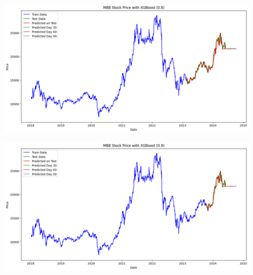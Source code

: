 \documentclass[conference]{IEEEtran}
\begin{document}
\begin{minipage}{0.23\textwidth}
    \centering
    \includegraphics[width=\linewidth]{images/XGBoost/XGBoost_MBB_82.png}
    \label{fig:image1}
\end{minipage}
\hfill
\begin{minipage}{0.23\textwidth}
    \centering
    \includegraphics[width=\linewidth]{images/XGBoost/XGBoost_MBB_91.png}
    \label{fig:image2}
\end{minipage}
\end{document}

